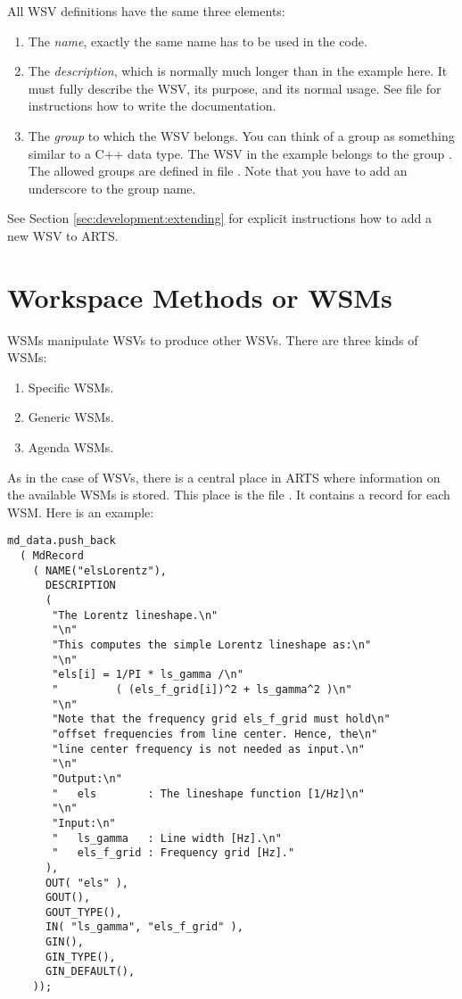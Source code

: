 \noindent
All WSV definitions have the same three elements:
\begin{enumerate}
\item The \emph{name}, exactly the
  same name has to be used in the code.
\item The \emph{description}, which is normally much longer than in
  the example here. It must fully describe the WSV, its purpose, and
  its normal usage. See file  for instructions
  how to write the documentation.
\item The \emph{group} to which the WSV belongs. You can think of a
  group as something similar to a C++ data type. The WSV in the
  example belongs to the group . The allowed groups
  are defined in file . Note that you have to add
  an underscore to the group name.
\end{enumerate}

\noindent
See Section \ref{sec:development:extending} for explicit
instructions how to add a new WSV to ARTS.

\section{Workspace Methods or WSMs}
\label{sec:agendas:wsms}

WSMs manipulate WSVs to produce other WSVs. There are three kinds of
WSMs:
\begin{enumerate}
\item Specific WSMs.
\item Generic WSMs.
\item Agenda WSMs.
\end{enumerate}
As in the case of WSVs, there is a central place in ARTS where
information on the available WSMs is stored. This place is the file
. It contains a record for each WSM. Here is an
example:

{\small
\begin{verbatim}
md_data.push_back
  ( MdRecord
    ( NAME("elsLorentz"),
      DESCRIPTION
      (
       "The Lorentz lineshape.\n"
       "\n"
       "This computes the simple Lorentz lineshape as:\n"
       "\n"
       "els[i] = 1/PI * ls_gamma /\n"
       "         ( (els_f_grid[i])^2 + ls_gamma^2 )\n"
       "\n"
       "Note that the frequency grid els_f_grid must hold\n"
       "offset frequencies from line center. Hence, the\n"
       "line center frequency is not needed as input.\n"
       "\n"
       "Output:\n"
       "   els        : The lineshape function [1/Hz]\n"
       "\n"
       "Input:\n"
       "   ls_gamma   : Line width [Hz].\n"
       "   els_f_grid : Frequency grid [Hz]."
      ),
      OUT( "els" ),
      GOUT(),
      GOUT_TYPE(),
      IN( "ls_gamma", "els_f_grid" ),
      GIN(),
      GIN_TYPE(),
      GIN_DEFAULT(),
    ));
\end{verbatim}
}


